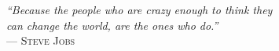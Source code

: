 {\sffamily\itshape
``Because the people who are crazy enough to think they \\
can change the world, are the ones who do.''\\}
--- \textsc{Steve Jobs}

